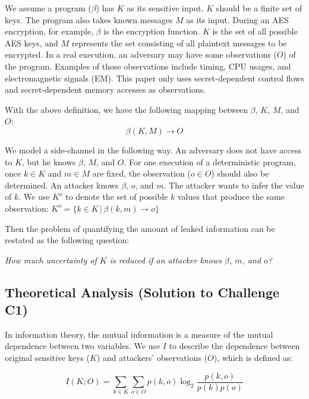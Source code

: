 We assume a program ($\beta$) has $K$ as its sensitive input. $K$ should be 
a finite set of keys. The program also takes known messages $M$ as its input. 
During an AES encryption, for example, 
$\beta$ is the encryption function. $K$ is the set of all possible AES keys, 
and $M$ represents the set consisting of all plaintext messages to be encrypted. In a real execution, an adversary may have 
some observations ($O$) of the program. Examples of those observations include 
timing, CPU usages, and electromagnetic signals (EM). This paper only
uses secret-dependent control flows and secret-dependent memory 
accesses as observations.

With the above definition, we have the following mapping between $\beta$,
$K$, $M$, and $O$:
\begin{displaymath}
    \beta(K, M) \rightarrow O
\end{displaymath}


We model a side-channel in the following way. An adversary does not have
access to $K$, but he knows $\beta$, $M$, and $O$. For one execution of a
deterministic program, once $k \in K$ and $m \in M$ are fixed, the observation
($o \in O$) should also be determined. An attacker knows $\beta$, $o$,
and $m$. The attacker wants to infer the value of $k$. We use $K^o$ to denote
the set of possible $k$ values that produce the same observation: $K^o = \{ k \in K \, |\, \beta(k, m) \rightarrow o\}$

Then the problem of quantifying the amount of leaked information can be
restated as the following question:

\emph{How much uncertainty of $K$ is reduced if an attacker knows $\beta$, $m$, and $o$?}

\subsection{Theoretical Analysis \textbf{(Solution to Challenge C1)}}
In information theory, the mutual information  is a measure of the mutual
dependence between two variables. We use $I$ to describe the
dependence between original sensitive keys ($K$) and attackers' observations ($O$), which is defined as:

\begin{equation} \label{eq:1}
    I(K;O) = \sum_{k {\in} K}{\sum_{o {\in} O}{p(k, o)\log_2\frac{p(k, o)}{p(k)p(o)}}}
\end{equation}

